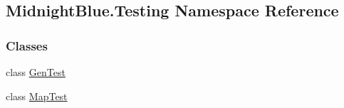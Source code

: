 \hypertarget{namespace_midnight_blue_1_1_testing}{}\subsection{Midnight\+Blue.\+Testing Namespace Reference}
\label{namespace_midnight_blue_1_1_testing}
\subsubsection*{Classes}
\begin{DoxyCompactItemize}
\item 
class \hyperlink{class_midnight_blue_1_1_testing_1_1_gen_test}{Gen\+Test}
\item 
class \hyperlink{class_midnight_blue_1_1_testing_1_1_map_test}{Map\+Test}
\end{DoxyCompactItemize}
